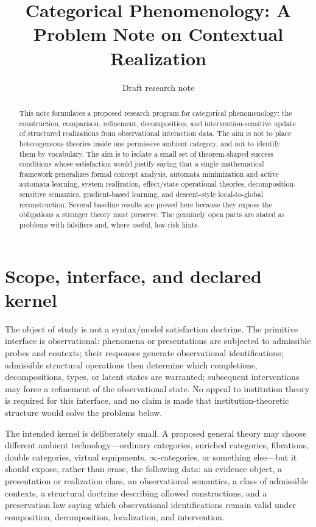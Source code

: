 \documentclass[11pt]{article}
\title{Categorical Phenomenology: A Problem Note on Contextual Realization}
\author{}
\date{Draft research note}
\theoremstyle{definition}
\theoremstyle{remark}
\begin{document}
\maketitle

\begin{abstract}
This note formulates a proposed research program for categorical phenomenology: the construction, comparison, refinement, decomposition, and intervention-sensitive update of structured realizations from observational interaction data. The aim is not to place heterogeneous theories inside one permissive ambient category, and not to identify them by vocabulary. The aim is to isolate a small set of theorem-shaped success conditions whose satisfaction would justify saying that a single mathematical framework generalizes formal concept analysis, automata minimization and active automata learning, system realization, effect/state operational theories, decomposition-sensitive semantics, gradient-based learning, and descent-style local-to-global reconstruction. Several baseline results are proved here because they expose the obligations a stronger theory must preserve. The genuinely open parts are stated as problems with falsifiers and, where useful, low-risk hints.
\end{abstract}

\tableofcontents

\section{Scope, interface, and declared kernel}

The object of study is not a syntax/model satisfaction doctrine. The primitive interface is observational: phenomena or presentations are subjected to admissible probes and contexts; their responses generate observational identifications; admissible structural operations then determine which completions, decompositions, types, or latent states are warranted; subsequent interventions may force a refinement of the observational state. No appeal to institution theory is required for this interface, and no claim is made that institution-theoretic structure would solve the problems below.

The intended kernel is deliberately small. A proposed general theory may choose different ambient technology---ordinary categories, enriched categories, fibrations, double categories, virtual equipments, $\infty$-categories, or something else---but it should expose, rather than erase, the following data: an evidence object, a presentation or realization class, an observational semantics, a class of admissible contexts, a structural doctrine describing allowed constructions, and a preservation law saying which observational identifications remain valid under composition, decomposition, localization, and intervention.
\end{document}

